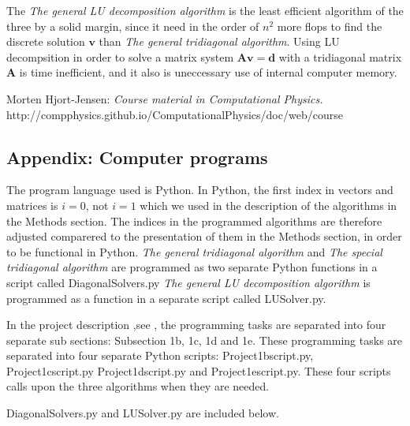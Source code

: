 \documentclass[11pt]{article}
\begin{document}
\vspace{5mm}
\noindent
The \emph{The general LU decomposition algorithm} is the least efficient algorithm
of the three by a solid margin, since it need in the order of 
$n^2$ more flops to find the discrete solution $\mathbf v$ than 
\emph{The general tridiagonal algorithm}. Using LU decompsition in order to solve a 
matrix system $\mathbf{Av} = \mathbf{d}$ with a tridiagonal matrix 
$\mathbf A$ is time inefficient, and it also is uneccessary 
use of internal computer memory.


\newpage
\noindent
\begin{thebibliography}{9}
 Morten Hjort-Jensen: \emph{Course material in Computational Physics.}\\
http://compphysics.github.io/ComputationalPhysics/doc/web/course
\end{thebibliography}


\newpage
\noindent
\subsection*{Appendix: Computer programs}
The program language used is Python. In Python, the first index in vectors and matrices is $i = 0$,
not $i = 1$ which we used in the description of the algorithms in the Methods section. 
The indices in the programmed algorithms are therefore adjusted comparered to the presentation of
them in the Methods section, in order to be functional in Python. 
\emph{The general tridiagonal algorithm} and \emph{The special tridiagonal algorithm} are
programmed as two separate Python functions in a script called Diagonal\textunderscore Solvers.py
\emph{The general LU decomposition algorithm} is programmed as a function in a separate script
called LU\textunderscore Solver.py. 


\vspace{4mm}
\noindent
In the project description ,see \cite{mhh}, the programming tasks are separated into four
separate sub sections: Subsection 1b, 1c, 1d and 1e. These programming tasks are
separated into four separate Python scripts: Project1b\textunderscore script.py, 
Project1c\textunderscore script.py
Project1d\textunderscore script.py and Project1e\textunderscore script.py. 
These four scripts calls upon the three
algorithms when they are needed.

\vspace{4mm}
\noindent
Diagonal\textunderscore Solvers.py and LU\textunderscore Solver.py are included below.
\end{document}
